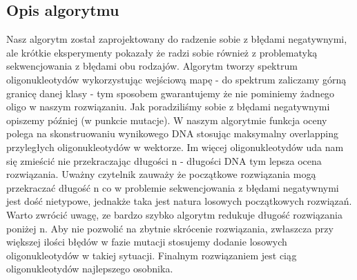 \documentclass{article}
\begin{document}
\subsection{Opis algorytmu}
Nasz algorytm został zaprojektowany do radzenie sobie z błędami negatywnymi, ale krótkie eksperymenty pokazały że radzi sobie również z problematyką sekwencjowania z błędami obu rodzajów.
Algorytm tworzy spektrum oligonukleotydów wykorzystując wejściową mapę -  do spektrum zaliczamy górną granicę danej klasy - tym sposobem gwarantujemy że nie pominiemy żadnego oligo w naszym rozwiązaniu. Jak poradziliśmy sobie z błędami negatywnymi opiszemy później (w punkcie mutacje). 
W naszym algorytmie funkcja oceny polega na skonstruowaniu wynikowego DNA stosując maksymalny overlapping przyległych oligonukleotydów w wektorze. Im więcej oligonukleotydów uda nam się zmieścić nie przekraczając długości n - długości DNA tym lepsza ocena rozwiązania. Uważny czytelnik zauważy że początkowe rozwiązania mogą przekraczać długość n co w problemie sekwencjowania z błędami negatywnymi jest dość nietypowe, jednakże taka jest natura losowych początkowych rozwiązań. Warto zwrócić uwagę, ze bardzo szybko algorytm redukuje długość rozwiązania poniżej n. Aby nie pozwolić na zbytnie skrócenie rozwiązania, zwłaszcza przy większej ilości błędów w fazie mutacji stosujemy dodanie losowych oligonukleotydów w takiej sytuacji. Finalnym rozwiązaniem jest ciąg oligonukleotydów najlepszego osobnika.
\end{document}
